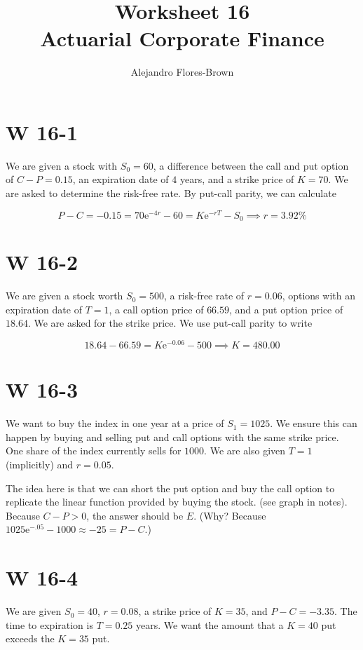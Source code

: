 \documentclass[12pt, letterpaper]{article}
\title{Worksheet 16 \\ Actuarial Corporate Finance}
\author{Alejandro Flores-Brown}
\newcommand{\e}{\mathrm{e}}
\begin{document}
    \maketitle

    \section{W 16-1} 

    We are given a stock with \(S_0 = 60\), a difference between the call and put option of \(C - P = 0.15\), an expiration date of \(4\) years, and a strike price of \(K = 70\). We are asked to determine the risk-free rate. By put-call parity, we can calculate

    \[ P - C = -0.15 = 70 \e^{-4r} - 60   = K \e^{-rT} - S_0 \implies r = 3.92\%    \]

    \section{W 16-2}

    We are given a stock worth \(S_0 = 500\), a risk-free rate of \(r = 0.06\), options with an expiration date of \(T = 1\), a call option price of \(66.59\), and a put option price of \(18.64\). We are asked for the strike price. We use put-call parity to write

    \[ 18.64 - 66.59 = K \e^{-0.06} - 500 \implies K = 480.00    \]

    \section{W 16-3}

    We want to buy the index in one year at a price of \(S_1 = 1025\). We ensure this can happen by buying and selling put and call options with the same strike price. One share of the index currently sells for \(1000\). We are also given \(T = 1\) (implicitly) and \(r = 0.05\). 
    
    The idea here is that we can short the put option and buy the call option to replicate the linear function provided by buying the stock. (see graph in notes). Because \(C - P > 0\), the answer should be \(E\). (Why? Because \(1025 \e^{-.05} - 1000 \approx -25 = P - C\).)

    \section{W 16-4}

    We are given \(S_0 = 40\), \(r = 0.08\), a strike price of \(K = 35\), and \(P - C = -3.35\). The time to expiration is \(T = 0.25\) years. We want the amount that a \(K = 40\) put exceeds the \(K = 35\) put.
    
\end{document}
